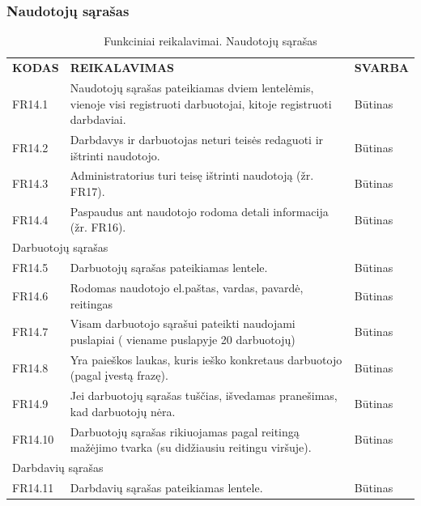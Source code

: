 \documentclass{VUMIFPSkursinis}
\begin{document}
\subsubsection{Naudotojų sąrašas}
\begin{table}[H]
\caption{Funkciniai reikalavimai. Naudotojų sąrašas}
\centering
\normalsize
\begin{tabular}{|p{2cm}|p{10cm}|p{3cm}|}
\hline
\rowcolor{gray!30}
\multicolumn{3}{|l|}{\textbf{14. Naudotojų sąrašas}} \\ \hline
\textbf{KODAS}& \multicolumn{1}{m{10cm}|}{\textbf{REIKALAVIMAS}} & \textbf{SVARBA} \\ \hline
FR14.1 & \multicolumn{1}{m{10cm}|}{Naudotojų sąrašas pateikiamas dviem lentelėmis, vienoje visi registruoti darbuotojai, kitoje registruoti darbdaviai.} & Būtinas \\ \hline
FR14.2 & \multicolumn{1}{m{10cm}|}{Darbdavys ir darbuotojas neturi teisės redaguoti ir ištrinti naudotojo.} & Būtinas \\ \hline
FR14.3 & \multicolumn{1}{m{10cm}|}{Administratorius turi teisę ištrinti naudotoją (žr. FR17).} & Būtinas \\ \hline
FR14.4 & \multicolumn{1}{m{10cm}|}{Paspaudus ant naudotojo rodoma detali informacija (žr. FR16).} & Būtinas \\ \hline
\multicolumn{3}{|l|}{Darbuotojų sąrašas} \\ \hline
FR14.5 & \multicolumn{1}{m{10cm}|}{Darbuotojų sąrašas pateikiamas lentele.} & Būtinas \\ \hline
FR14.6 & \multicolumn{1}{m{10cm}|}{Rodomas naudotojo el.paštas, vardas, pavardė, reitingas} & Būtinas \\ \hline
FR14.7 & \multicolumn{1}{m{10cm}|}{Visam darbuotojo sąrašui pateikti naudojami puslapiai ( viename puslapyje 20 darbuotojų)} & Būtinas \\ \hline
FR14.8 & \multicolumn{1}{m{10cm}|}{Yra paieškos laukas, kuris  ieško konkretaus darbuotojo (pagal įvestą frazę).} & Būtinas \\ \hline
FR14.9 & \multicolumn{1}{m{10cm}|}{Jei darbuotojų sąrašas tuščias, išvedamas pranešimas, kad darbuotojų nėra.} & Būtinas \\ \hline
FR14.10 & \multicolumn{1}{m{10cm}|}{Darbuotojų sąrašas rikiuojamas pagal reitingą mažėjimo tvarka (su didžiausiu reitingu viršuje).} & Būtinas \\ \hline
\multicolumn{3}{|l|}{Darbdavių sąrašas} \\ \hline
FR14.11 & \multicolumn{1}{m{10cm}|}{Darbdavių sąrašas pateikiamas lentele.} & Būtinas \\ \hline

\end{tabular}
\end{table}
\end{document}

